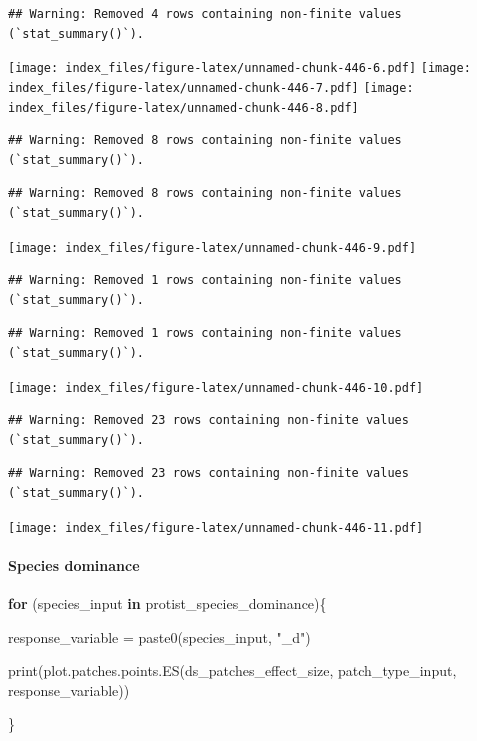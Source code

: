 \documentclass[
]{article}
\newenvironment{Shaded}{\begin{snugshade}}{\end{snugshade}}
\newcommand{\ControlFlowTok}[1]{\textcolor[rgb]{0.13,0.29,0.53}{\textbf{#1}}}
\newcommand{\FunctionTok}[1]{\textcolor[rgb]{0.00,0.00,0.00}{#1}}
\newcommand{\NormalTok}[1]{#1}
\newcommand{\OtherTok}[1]{\textcolor[rgb]{0.56,0.35,0.01}{#1}}
\newcommand{\StringTok}[1]{\textcolor[rgb]{0.31,0.60,0.02}{#1}}
\begin{document}
\begin{verbatim}
## Warning: Removed 4 rows containing non-finite values (`stat_summary()`).
\end{verbatim}

\texttt{[image: index\_files/figure-latex/unnamed-chunk-446-6.pdf]}
\texttt{[image: index\_files/figure-latex/unnamed-chunk-446-7.pdf]}
\texttt{[image: index\_files/figure-latex/unnamed-chunk-446-8.pdf]}

\begin{verbatim}
## Warning: Removed 8 rows containing non-finite values (`stat_summary()`).
\end{verbatim}

\begin{verbatim}
## Warning: Removed 8 rows containing non-finite values (`stat_summary()`).
\end{verbatim}

\texttt{[image: index\_files/figure-latex/unnamed-chunk-446-9.pdf]}

\begin{verbatim}
## Warning: Removed 1 rows containing non-finite values (`stat_summary()`).
\end{verbatim}

\begin{verbatim}
## Warning: Removed 1 rows containing non-finite values (`stat_summary()`).
\end{verbatim}

\texttt{[image: index\_files/figure-latex/unnamed-chunk-446-10.pdf]}

\begin{verbatim}
## Warning: Removed 23 rows containing non-finite values (`stat_summary()`).
\end{verbatim}

\begin{verbatim}
## Warning: Removed 23 rows containing non-finite values (`stat_summary()`).
\end{verbatim}

\texttt{[image: index\_files/figure-latex/unnamed-chunk-446-11.pdf]}

\hypertarget{species-dominance-3}{%
\paragraph{Species dominance}\label{species-dominance-3}}

\begin{Shaded}
\begin{Highlighting}[]
\ControlFlowTok{for}\NormalTok{ (species\_input }\ControlFlowTok{in}\NormalTok{ protist\_species\_dominance)\{}
  
\NormalTok{  response\_variable }\OtherTok{=} \FunctionTok{paste0}\NormalTok{(species\_input, }\StringTok{"\_d"}\NormalTok{)}
  
  \FunctionTok{print}\NormalTok{(}\FunctionTok{plot.patches.points.ES}\NormalTok{(ds\_patches\_effect\_size, patch\_type\_input,}
\NormalTok{                              response\_variable))}
  
\NormalTok{\}}
\end{Highlighting}
\end{Shaded}
\end{document}

